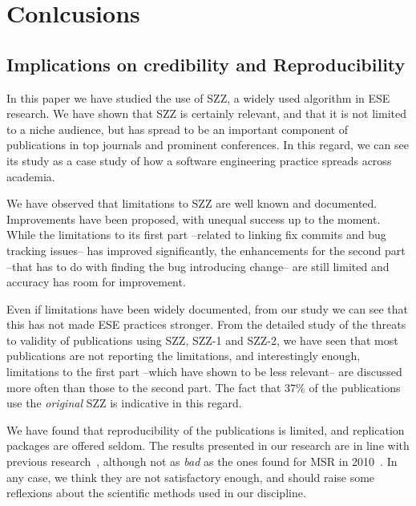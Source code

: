 \documentclass[a4paper, 12pt]{book}
\begin{document}
\section{Conlcusions}
\subsection{Implications on credibility and Reproducibility}
\label{subsec:implications}
In this paper we have studied the use of SZZ, a widely used algorithm in ESE research. We have shown that SZZ is certainly relevant, and that it is not limited to a niche audience, but has spread to be an important component of publications in top journals and prominent conferences. In this regard, we can see its study as a case study of how a software engineering practice spreads across academia.

We have observed that limitations to SZZ are well known and documented. Improvements have been proposed, with unequal success up to the moment. While the limitations to its first part --related to linking fix commits and bug tracking issues-- has improved significantly, the enhancements for the second part --that has to do with finding the bug introducing change-- are still limited and accuracy has room for improvement.

Even if limitations have been widely documented, from our study we can see that this has not made ESE practices stronger. From the detailed study of the threats to validity of publications using SZZ, SZZ-1 and SZZ-2, we have seen that most publications are not reporting the limitations, and interestingly enough, limitations to the first part --which have shown to be less relevant-- are discussed more often than those to the second part. The fact that 37\% of the publications use the \emph{original} SZZ is indicative in this regard.

We have found that reproducibility of the publications is limited, and replication packages are offered seldom. The results presented in our research are in line with previous research~\cite{amann2015software}, although not as \emph{bad} as the ones found for MSR in 2010~\cite{robles2010replicating}. In any case, we think they are not satisfactory enough, and should raise some reflexions about the scientific methods used in our discipline.
\end{document}
